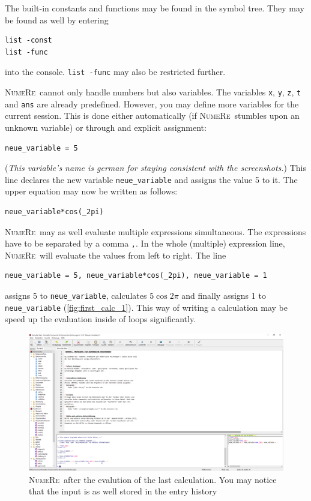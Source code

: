 \documentclass[DIV=14,headsepline,footsepline]{scrbook}
\newcommand{\NR}{\textsc{Nu\-me\-Re}}
\begin{document}
				The built-in constants and functions may be found in the symbol tree. They may be found as well by entering 
				\begin{lstlisting}
list -const
list -func
				\end{lstlisting}
				into the console. \lstinline+list -func+ may also be restricted further.
				
				\NR\ cannot only handle numbers but also variables. The variables \lstinline+x+, \lstinline+y+, \lstinline+z+, \lstinline+t+ and \lstinline+ans+ are already predefined. However, you may define more variables for the current session. This is done either automatically (if \NR\ stumbles upon an unknown variable) or through and explicit assignment:
				\begin{lstlisting}
neue_variable = 5
				\end{lstlisting}
				(\emph{This variable's name is german for staying consistent with the screenshots.}) This line declares the new variable \lstinline+neue_variable+ and assigns the value 5 to it. The upper equation may now be written as follows:
				\begin{lstlisting}
neue_variable*cos(_2pi)
				\end{lstlisting}
				
				\NR\ may as well evaluate multiple expressions simultaneous. The expressions have to be separated by a comma \lstinline+,+. In the whole (multiple) expression line, \NR\ will evaluate the values from left to right. The line
				\begin{lstlisting}
neue_variable = 5, neue_variable*cos(_2pi), neue_variable = 1
				\end{lstlisting}
				assigns 5 to \lstinline+neue_variable+, calculates $5\cos2\pi$ and finally assigns 1 to \lstinline+neue_variable+ (\autoref{fig:first_calc_1}). This way of writing a calculation may be speed up the evaluation inside of loops significantly.
				
				\begin{figure}[htb]%
					\centering
					\includegraphics[width=\textwidth]{_graphics/first_calc_1.png}
					\caption{\NR\ after the evalution of the last calculation. You may notice that the input is as well stored in the entry history}
					\label{fig:first_calc_1}
				\end{figure}
\end{document}
